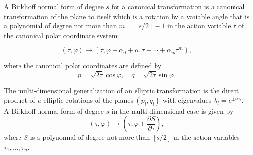 A Birkhoff normal form of degree $s$ for a canonical transformation is a canonical transformation of the plane to itself which is a rotation by a variable angle that is a polynomial of degree not more than $m = [s/2] - 1$ in the action variable $\tau$ of the canonical polar coordinate system:

$$(\tau, \varphi) \to (\tau, \varphi + \alpha_0 + \alpha_1 \tau + \cdots + \alpha_m \tau^m),$$

where the canonical polar coordinates are defined by
$$p = \sqrt{2\tau} \cos \varphi, \quad q = \sqrt{2\tau} \sin \varphi.$$

The multi-dimensional generalization of an elliptic transformation is the direct product of $n$ elliptic rotations of the planes $(p_l, q_l)$ with eigenvalues $\lambda_l = e^{\pm i\alpha_l}$. A Birkhoff normal form of degree $s$ in the multi-dimensional case is given by
$$(\tau, \varphi) \to \left( \tau, \varphi + \frac{\partial S}{\partial \tau} \right),$$
where $S$ is a polynomial of degree not more than $[s/2]$ in the action variables $\tau_1, \ldots, \tau_n$.

